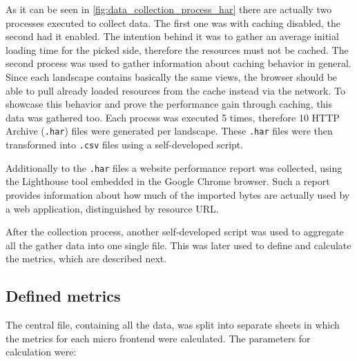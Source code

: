As it can be seen in \ref{fig:data_collection_process_har} there are actually two processes executed to collect data. The first one was with caching disabled, the second had it enabled. The intention behind it was to gather an average initial loading time for the picked side, therefore the resources must not be cached. 
The second process was used to gather information about caching behavior in general. Since each landscape contains basically the same views, the browser should be able to pull already loaded resources from the cache instead via the network. To showcase this behavior and prove the performance gain through caching, this data was gathered too.
Each process was executed 5 times, therefore 10 HTTP Archive (\texttt{.har}) files were generated per landscape. These \texttt{.har} files were then transformed into \texttt{.csv} files using a self-developed script. 

Additionally to the \texttt{.har} files a website performance report was collected, using the Lighthouse tool embedded in the Google Chrome browser. Such a report provides information about how much of the imported bytes are actually used by a web application, distinguished by resource URL.

After the collection process, another self-developed script was used to aggregate all the gather data into one single file. This was later used to define and calculate the metrics, which are described next.

\subsection{Defined metrics}

The central file, containing all the data, was split into separate sheets in which the metrics for each micro frontend were calculated. The parameters for calculation were:

